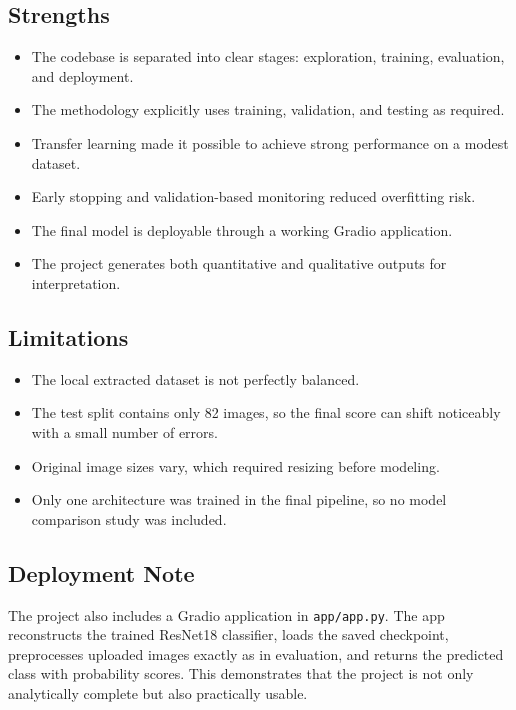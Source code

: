 \documentclass[12pt,a4paper]{article}
\begin{document}
\subsection*{Strengths}
\begin{itemize}
    \item The codebase is separated into clear stages: exploration, training, evaluation, and deployment.
    \item The methodology explicitly uses training, validation, and testing as required.
    \item Transfer learning made it possible to achieve strong performance on a modest dataset.
    \item Early stopping and validation-based monitoring reduced overfitting risk.
    \item The final model is deployable through a working Gradio application.
    \item The project generates both quantitative and qualitative outputs for interpretation.
\end{itemize}

\subsection*{Limitations}
\begin{itemize}
    \item The local extracted dataset is not perfectly balanced.
    \item The test split contains only 82 images, so the final score can shift noticeably with a small number of errors.
    \item Original image sizes vary, which required resizing before modeling.
    \item Only one architecture was trained in the final pipeline, so no model comparison study was included.
\end{itemize}

\subsection*{Deployment Note}
The project also includes a Gradio application in \texttt{app/app.py}. The app reconstructs the trained ResNet18 classifier, loads the saved checkpoint, preprocesses uploaded images exactly as in evaluation, and returns the predicted class with probability scores. This demonstrates that the project is not only analytically complete but also practically usable.
\end{document}
